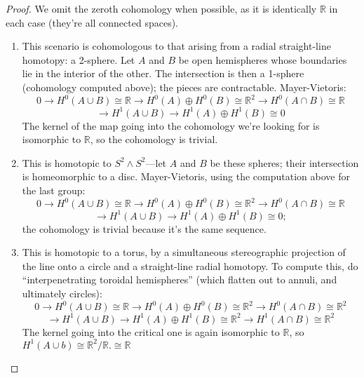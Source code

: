 \documentclass{article}
\begin{document}
\begin{proof} We omit the zeroth cohomology when possible, as it is identically $\mathbb{R}$ in each case (they're all connected spaces).
  \begin{enumerate}
  \item This scenario is cohomologous to that arising from a radial straight-line homotopy: a 2-sphere.
    Let $A$ and $B$ be open hemispheres whose boundaries lie in the interior of the other.
    The intersection is then a 1-sphere (cohomology computed above); the pieces are contractable.
    Mayer-Vietoris:
    \[
      0 \to H^{0}(A \cup B) \cong \mathbb{R} \to H^{0}(A) \oplus H^{0}(B) \cong \mathbb{R}^{2} \to H^{0}(A \cap B) \cong \mathbb{R}
    \]
    \[
      \to H^{1}(A \cup B) \to H^{1}(A) \oplus H^{1}(B) \cong 0
    \]
    The kernel of the map going into the cohomology we're looking for is isomorphic to $\mathbb{R}$, so the cohomology is trivial.
  \item This is homotopic to $S^{2} \wedge S^{2}$---let $A$ and $B$ be these spheres; their intersection is homeomorphic to a disc.
    Mayer-Vietoris, using the computation above for the last group:
    \[
      0 \to H^{0}(A \cup B) \cong \mathbb{R} \to H^{0}(A) \oplus H^{0}(B) \cong \mathbb{R}^{2} \to H^{0}(A \cap B) \cong \mathbb{R}
    \]
    \[
      \to H^{1}(A \cup B) \to H^{1}(A) \oplus H^{1}(B) \cong 0;
    \]
    the cohomology is trivial because it's the same sequence.
  \item This is homotopic to a torus, by a simultaneous stereographic projection of the line onto a circle
    and a straight-line radial homotopy.
    To compute this, do ``interpenetrating toroidal hemispheres'' (which flatten out to annuli, and ultimately circles):
    \[
      0 \to H^{0}(A \cup B) \cong \mathbb{R} \to H^{0}(A) \oplus H^{0}(B) \cong \mathbb{R}^{2} \to H^{0}(A \cap B) \cong \mathbb{R}^{2}
    \]
    \[
      \to H^{1}(A \cup B) \to H^{1}(A) \oplus H^{1}(B) \cong \mathbb{R}^{2} \to H^{1}(A \cap B) \cong \mathbb{R}^{2}
    \]
    The kernel going into the critical one is again isomorphic to $\mathbb{R}$, so $H^{1}(A \cup b) \cong \mathbb{R}^{2}/ \mathbb{R}.
    \cong \mathbb{R}$


\end{enumerate}
\end{proof}
\end{document}
